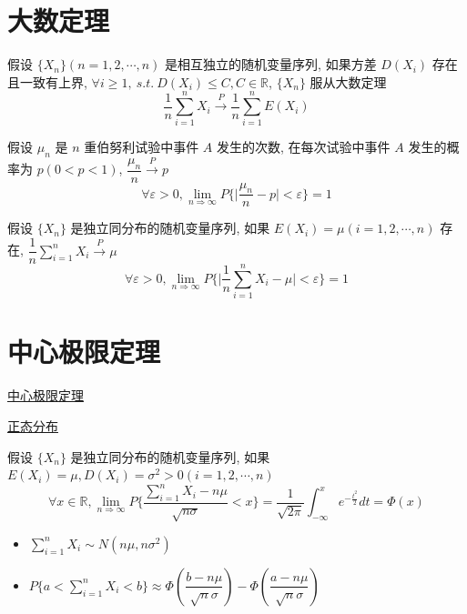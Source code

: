 \section{大数定理}

\begin{theorem}[切比雪夫大数定理]
	假设 $\{X_{n}\}(n = 1,2,\cdots, n)$ 是相互独立的随机变量序列, 如果方差 $D(X_{i})$ 存在且一致有上界, $\forall i\geq 1,\ s.t.\ D(X_{i})\leq C, C\in \mathbb{R}$,
	$\{X_{n}\}$ 服从大数定理
	$$\dfrac{1}{n}\sum\limits_{i = 1}^{n}X_{i} \stackrel{P}{\longrightarrow} \dfrac{1}{n}\sum\limits_{i=1}^{n}E(X_{i})$$
\end{theorem}

\begin{theorem}[伯努利大数定理]
	假设 $\mu_{n}$ 是 $n$ 重伯努利试验中事件 $A$ 发生的次数, 在每次试验中事件 $A$ 发生的概率为 $p(0<p<1)$, $\dfrac{\mu_{n}}{n}\stackrel{P}{\longrightarrow}p$
	$$\forall \varepsilon > 0,\lim\limits_{n\Rightarrow \infty}P\{\big|\dfrac{\mu_{n}}{n} - p\big| < \varepsilon\} = 1$$
\end{theorem}

\begin{theorem}[辛钦大数定理]
	假设 $\{X_{n}\}$ 是独立同分布的随机变量序列, 如果 $E(X_{i}) = \mu(i = 1,2,\cdots,n)$ 存在, $\dfrac{1}{n}\sum\limits_{i=1}^{n}X_{i}\stackrel{P}{\longrightarrow}\mu$
	$$\forall \varepsilon > 0,\lim\limits_{n\Rightarrow \infty}P\{\big|\dfrac{1}{n}\sum\limits_{i=1}^{n}X_{i}-\mu\big| < \varepsilon\} = 1$$
\end{theorem}

\section{中心极限定理}

\href{https://www.bilibili.com/video/BV1gh4y1W7ag/?spm_id_from=333.999.list.card_archive.click}{中心极限定理}

\href{https://www.bilibili.com/video/BV1wu411W7uU/?spm_id_from=333.999.list.card_archive.click}{正态分布}

\begin{theorem}[列维-林德伯格定理]
	假设 $\{X_{n}\}$ 是独立同分布的随机变量序列, 如果 $E(X_{i}) = \mu, D(X_{i}) = \sigma^2 > 0(i = 1,2,\cdots,n)$
	$$\forall x \in \mathbb{R}, \lim\limits_{n\Rightarrow \infty}P\{\dfrac{\sum\limits_{i=1}^{n}X_{i}-n\mu}{\sqrt{n\sigma}}<x\} = \dfrac{1}{\sqrt{2\pi}}\int_{-\infty}^{x}e^{-\frac{t^2}{2}}dt=\varPhi(x)$$
\end{theorem}
\begin{corollary}[中心极限定理推论]
	\begin{itemize}
		\item $\sum\limits_{i = 1}^{n}X_{i}\sim N(n\mu,n\sigma^2)$
		\item $P\{a<\sum\limits_{i=1}^{n}X_{i}<b\}\approx\varPhi(\dfrac{b-n\mu}{\sqrt{n}\sigma})-\varPhi(\dfrac{a-n\mu}{\sqrt{n}\sigma})$
	\end{itemize}
\end{corollary}

